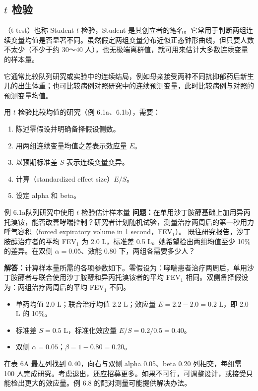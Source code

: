 \subsection{\texorpdfstring{$t$}{t} 检验}
（t test）也称 Student $t$ 检验，Student 是其创立者的笔名。它常用于判断两组连续变量均值是否显著不同。虽然假定两组变量分布近似正态钟形曲线，但只要人数不太少（不少于约 30～40 人），也无极端离群值，就可用来估计大多数连续变量的样本量。

它通常比较队列研究或实验中的连续结局，例如母亲接受两种不同抗抑郁药后新生儿的出生体重；也可比较病例对照研究中的连续预测变量，此时比较病例与对照的预测变量均值。

用 $t$ 检验比较均值的研究（例 6.1a、6.1b），需要：
\begin{enumerate}
\item 陈述零假设并明确备择假设侧数。
\item 用两组连续变量均值之差表示效应量 $E$。
\item 以预期标准差 $S$ 表示连续变量变异。
\item 计算（standardized effect size）$E/S$。
\item 设定 alpha 和 beta。
\end{enumerate}
\begin{bookbox}{例 6.1a\quad 队列研究中使用 $t$ 检验估计样本量}
\textbf{问题：}在单用沙丁胺醇基础上加用异丙托溴铵，能否改善哮喘控制？研究者计划随机试验，测量治疗两周后的第一秒用力呼气容积（forced expiratory volume in 1 second，FEV$_1$）。
既往研究报告，沙丁胺醇治疗者的平均 FEV$_1$ 为 2.0 L，标准差 0.5 L。她希望检出两组均值至少 10\% 的差异。在双侧 $\alpha=0.05$、效能 0.80 下，两组各需要多少人？

\textbf{解答：}计算样本量所需的各项参数如下。零假设为：哮喘患者治疗两周后，单用沙丁胺醇者与联合使用沙丁胺醇和异丙托溴铵者的平均 FEV$_1$ 相同。双侧备择假设为：两组治疗两周后的平均 FEV$_1$ 不同。
\begin{itemize}
\item 单药均值 2.0 L；联合治疗均值 2.2 L；效应量 $E=2.2-2.0=0.2$ L，即 2.0 L 的 10\%。
\item 标准差 $S=0.5$ L，标准化效应量 $E/S=0.2/0.5=0.40$。
\item 双侧 $\alpha=0.05$；$\beta=1-0.80=0.20$。
\end{itemize}
在表 6A 最左列找到 0.40，向右与双侧 alpha 0.05、beta 0.20 列相交，每组需 100 人完成研究。考虑退出，还应招募更多。如果不可行，可调整设计，或接受只能检出更大的效应量。例 6.8 的配对测量可能提供解决办法。
\end{bookbox}
